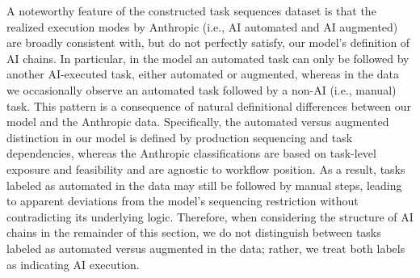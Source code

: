 
A noteworthy feature of the constructed task sequences dataset is that the realized execution modes by Anthropic (i.e., AI automated and AI augmented) are broadly consistent with, but do not perfectly satisfy, our model's definition of AI chains.
In particular, in the model an automated task can only be followed by another AI-executed task, either automated or augmented, whereas in the data we occasionally observe an automated task followed by a non-AI (i.e., manual) task.
This pattern is a consequence of natural definitional differences between our model and the Anthropic data.
Specifically, the automated versus augmented distinction in our model is defined by production sequencing and task dependencies, whereas the Anthropic classifications are based on task-level exposure and feasibility and are agnostic to workflow position.
As a result, tasks labeled as automated in the data may still be followed by manual steps, leading to apparent deviations from the model's sequencing restriction without contradicting its underlying logic.
Therefore, when considering the structure of AI chains in the remainder of this section, we do not distinguish between tasks labeled as automated versus augmented in the data; rather, we treat both labels as indicating AI execution. 



